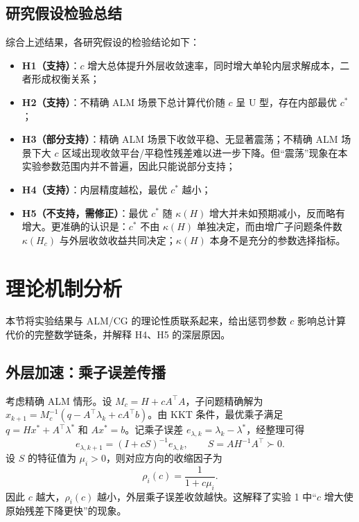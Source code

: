 \documentclass[UTF8]{ctexart}
\numberwithin{figure}{section}
\theoremstyle{definition}
\theoremstyle{examplestyle}
\theoremstyle{remark}
\begin{document}
\subsection{研究假设检验总结}
\label{sec:res-summary}

综合上述结果，各研究假设的检验结论如下：

\begin{itemize}
\item \textbf{H1（支持）}：$c$ 增大总体提升外层收敛速率，同时增大单轮内层求解成本，二者形成权衡关系；
\item \textbf{H2（支持）}：不精确 ALM 场景下总计算代价随 $c$ 呈 U 型，存在内部最优 $c^*$；
\item \textbf{H3（部分支持）}：精确 ALM 场景下收敛平稳、无显著震荡；不精确 ALM 场景下大 $c$ 区域出现收敛平台/平稳性残差难以进一步下降。但“震荡”现象在本实验参数范围内并不普遍，因此只能说部分支持；
\item \textbf{H4（支持）}：内层精度越松，最优 $c^*$ 越小；
\item \textbf{H5（不支持，需修正）}：最优 $c^*$ 随 $\kappa(H)$ 增大并未如预期减小，反而略有增大。更准确的认识是：$c^*$ 不由 $\kappa(H)$ 单独决定，而由增广子问题条件数 $\kappa(H_c)$ 与外层收敛收益共同决定；$\kappa(H)$ 本身不是充分的参数选择指标。
\end{itemize}

\section{理论机制分析}
\label{sec:mechanism}

本节将实验结果与 ALM/CG 的理论性质联系起来，给出惩罚参数 $c$ 影响总计算代价的完整数学链条，并解释 H4、H5 的深层原因。

\subsection{外层加速：乘子误差传播}
\label{sec:mech-outer}

考虑精确 ALM 情形。设 $M_c=H+cA^\top A$，子问题精确解为 $x_{k+1}=M_c^{-1}(q-A^\top\lambda_k+cA^\top b)$。由 KKT 条件，最优乘子满足 $q=Hx^*+A^\top\lambda^*$ 和 $Ax^*=b$。记乘子误差 $e_{\lambda,k}=\lambda_k-\lambda^*$，经整理可得
\begin{equation}
\label{eq:multiplier-error}
e_{\lambda,k+1}=(I+cS)^{-1}e_{\lambda,k}, \qquad S=AH^{-1}A^\top\succ0.
\end{equation}
设 $S$ 的特征值为 $\mu_i>0$，则对应方向的收缩因子为
\begin{equation}
\label{eq:contraction}
\rho_i(c)=\frac{1}{1+c\mu_i}.
\end{equation}
因此 $c$ 越大，$\rho_i(c)$ 越小，外层乘子误差收敛越快。这解释了实验 1 中“$c$ 增大使原始残差下降更快”的现象。
\end{document}
